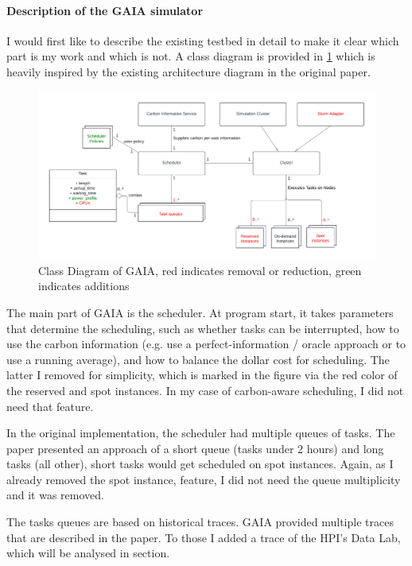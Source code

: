 \paragraph{Description of the GAIA simulator}

I would first like to describe the existing testbed in detail to make it clear which part is my work and which is not. A class diagram is provided in \ref{fig:class_diagram} which is heavily inspired by the existing architecture diagram in the original paper. 

\begin{figure}
    \includegraphics[width=\linewidth]{images/MA Thesis Diagram.pdf}
    \caption{Class Diagram of GAIA, red indicates removal or reduction, green indicates additions}
    \label{fig:class_diagram}
\end{figure}

The main part of GAIA is the scheduler. At program start, it takes parameters that determine the scheduling, such as whether tasks can be interrupted, how to use the carbon information (e.g. use a perfect-information / oracle approach or to use a running average), and how to balance the dollar cost for scheduling. 
The latter I removed for simplicity, which is marked in the figure via the red color of the reserved and spot instances. In my case of carbon-aware scheduling, I did not need that feature.

In the original implementation, the scheduler had multiple queues of tasks. 
The paper presented an approach of a short queue (tasks under 2 hours) and long tasks (all other), short tasks would get scheduled on spot instances. 
Again, as I already removed the spot instance, feature, I did not need the queue multiplicity and it was removed.

The tasks queues are based on historical traces. GAIA provided multiple traces that are described in the paper. To those I added a trace of the HPI's Data Lab, which will be analysed in section.

